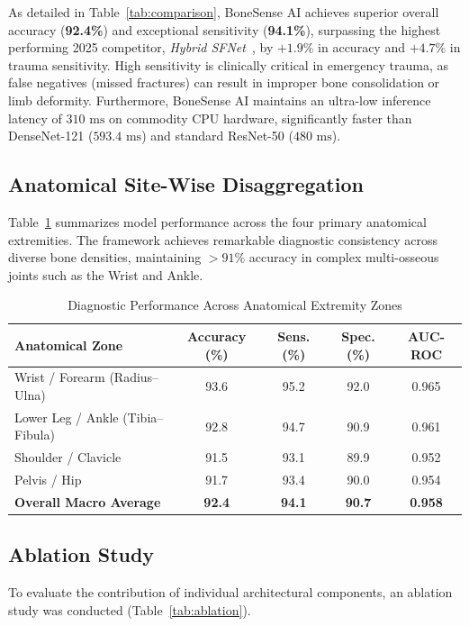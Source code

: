 \documentclass[journal]{IEEEtran}
\begin{document}
As detailed in Table~\ref{tab:comparison}, BoneSense AI achieves superior overall accuracy (\textbf{92.4\%}) and exceptional sensitivity (\textbf{94.1\%}), surpassing the highest performing 2025 competitor, \textit{Hybrid SFNet}~\cite{sfnet2025}, by $+1.9\%$ in accuracy and $+4.7\%$ in trauma sensitivity. High sensitivity is clinically critical in emergency trauma, as false negatives (missed fractures) can result in improper bone consolidation or limb deformity. Furthermore, BoneSense AI maintains an ultra-low inference latency of $310\text{ ms}$ on commodity CPU hardware, significantly faster than DenseNet-121 ($593.4\text{ ms}$) and standard ResNet-50 ($480\text{ ms}$).

\subsection{Anatomical Site-Wise Disaggregation}
Table~\ref{tab:anatomy} summarizes model performance across the four primary anatomical extremities. The framework achieves remarkable diagnostic consistency across diverse bone densities, maintaining $>91\%$ accuracy in complex multi-osseous joints such as the Wrist and Ankle.

\begin{table}[h]
\centering
\caption{Diagnostic Performance Across Anatomical Extremity Zones}
\label{tab:anatomy}
\begin{tabular}{lcccc}
\toprule
\textbf{Anatomical Zone} & \textbf{Accuracy (\%)} & \textbf{Sens. (\%)} & \textbf{Spec. (\%)} & \textbf{AUC-ROC} \\
\midrule
Wrist / Forearm (Radius--Ulna) & 93.6 & 95.2 & 92.0 & 0.965 \\
Lower Leg / Ankle (Tibia--Fibula) & 92.8 & 94.7 & 90.9 & 0.961 \\
Shoulder / Clavicle & 91.5 & 93.1 & 89.9 & 0.952 \\
Pelvis / Hip & 91.7 & 93.4 & 90.0 & 0.954 \\
\midrule
\textbf{Overall Macro Average} & \textbf{92.4} & \textbf{94.1} & \textbf{90.7} & \textbf{0.958} \\
\bottomrule
\end{tabular}
\end{table}

\subsection{Ablation Study}
To evaluate the contribution of individual architectural components, an ablation study was conducted (Table~\ref{tab:ablation}).
\end{document}
